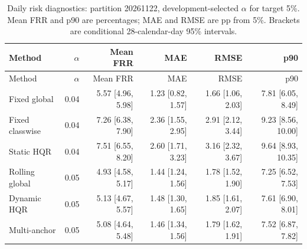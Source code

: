 \begingroup\small\setlength{\tabcolsep}{3pt}
\begin{longtable}{lrrrrr}
\caption{Daily risk diagnostics: partition 20261122, development-selected $\alpha$ for target 5\%. Mean FRR and p90 are percentages; MAE and RMSE are pp from 5\%. Brackets are conditional 28-calendar-day 95\% intervals.}\label{tab:final-risk-1-1}\\
\toprule
Method & $\alpha$ & Mean FRR & MAE & RMSE & p90\\
\midrule
\endfirsthead
\toprule
Method & $\alpha$ & Mean FRR & MAE & RMSE & p90\\
\midrule
\endhead
Fixed global & 0.04 & 5.57 [4.96, 5.98] & 1.23 [0.82, 1.57] & 1.66 [1.06, 2.03] & 7.81 [6.05, 8.49]\\
Fixed classwise & 0.04 & 7.26 [6.38, 7.90] & 2.36 [1.55, 2.95] & 2.91 [2.12, 3.44] & 9.23 [8.56, 10.00]\\
Static HQR & 0.04 & 7.51 [6.55, 8.20] & 2.60 [1.71, 3.23] & 3.16 [2.32, 3.67] & 9.64 [8.93, 10.35]\\
Rolling global & 0.05 & 4.93 [4.58, 5.17] & 1.44 [1.24, 1.56] & 1.78 [1.52, 1.90] & 7.25 [6.52, 7.53]\\
Dynamic HQR & 0.05 & 5.13 [4.67, 5.57] & 1.48 [1.30, 1.65] & 1.85 [1.61, 2.07] & 7.61 [6.90, 8.01]\\
Multi-anchor & 0.05 & 5.08 [4.64, 5.48] & 1.46 [1.34, 1.56] & 1.79 [1.62, 1.91] & 7.52 [6.87, 7.82]\\
\bottomrule
\end{longtable}
\endgroup
